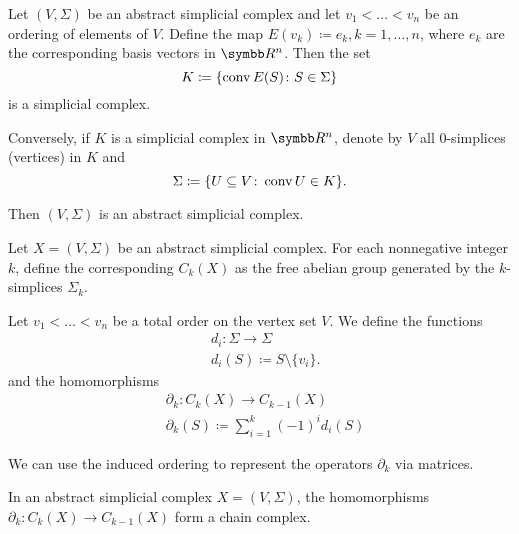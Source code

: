 \begin{proposition}\label{thm:abstract_simplicial_complex_iff_simplicial_complex}
  Let \( (V, \Sigma) \) be an abstract simplicial complex and let \( v_1 < \ldots < v_n \) be an ordering of elements of \( V \). Define the map \( E(v_k) \coloneqq e_k, k = 1, \ldots, n \), where \( e_k \) are the corresponding basis vectors in \( \BB{R^n} \). Then the set
  \begin{equation*}
    K \coloneqq \{ \operatorname{conv} E(S) \colon S \in \Sigma \}
  \end{equation*}
  is a simplicial complex.

  Conversely, if \( K \) is a simplicial complex in \( \BB{R^n} \), denote by \( V \) all \( 0 \)-simplices (vertices) in \( K \) and
  \begin{equation*}
    \Sigma \coloneqq \{ U \subseteq V \colon \operatorname{conv} U \in K \}.
  \end{equation*}

  Then \( (V, \Sigma) \) is an abstract simplicial complex.
\end{proposition}

\begin{definition}\label{def:group_of_chains}\cite[262]{Carlsson2009}
  Let \( X = (V, \Sigma) \) be an abstract simplicial complex. For each nonnegative integer \( k \), define the corresponding  \( C_k(X) \) as the free abelian group generated by the \( k \)-simplices \( \Sigma_k \).

  Let \( v_1 < \ldots < v_n \) be a total order on the vertex set \( V \). We define the functions
  \begin{align*}
    &d_i: \Sigma \to \Sigma \\
    &d_i(S) \coloneqq S \setminus \{ v_i \}.
  \end{align*}
  and the homomorphisms
  \begin{align*}
    &\partial_k: C_k(X) \to C_{k-1}(X) \\
    &\partial_k(S) \coloneqq \sum_{i=1}^k (-1)^i d_i(S)
  \end{align*}

  We can use the induced ordering to represent the operators \( \partial_k \) via matrices.
\end{definition}

\begin{proposition}\label{def:abstract_simplicial_chain_complex}
  In an abstract simplicial complex \( X = (V, \Sigma) \), the homomorphisms \( \partial_k: C_k(X) \to C_{k-1}(X) \) form a chain complex.
\end{proposition}
